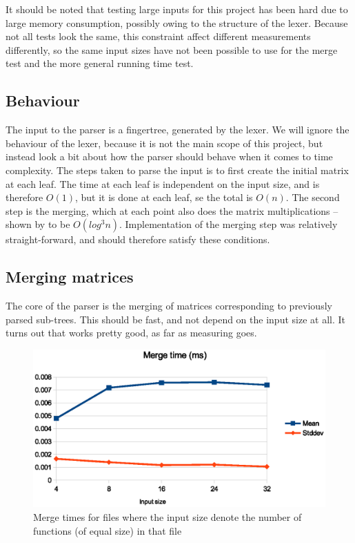 \documentclass[a4paper,12pt,twosided]{report}
\begin{document}
It should be noted that testing large inputs for this project has been hard due
to large memory consumption, possibly owing to the structure of the lexer.
Because not all tests look the same, this constraint affect different
measurements differently, so the same input sizes have not been possible to use
for the merge test and the more general running time test.

\subsection{Behaviour}
The input to the parser is a fingertree, generated by the lexer. We will ignore
the behaviour of the lexer, because it is not the main scope of this project, but
instead look a bit about how the parser should behave when it comes to time
complexity. The steps taken to parse the input is to first create the initial
matrix at each leaf. The time at each leaf is independent on the input size, and
is therefore $O(1)$, but it is done at each leaf, se the total is $O(n)$. The
second step is the merging, which at each point also does the matrix
multiplications -- shown by \citeauthor{parparsepaper} to be $O(log^3 n)$.
Implementation of the merging step was relatively straight-forward, and should
therefore satisfy these conditions. 

\subsection{Merging matrices}
The core of the parser is the merging of matrices corresponding to previously
parsed sub-trees. This should be fast, and not depend on the input size at all.
It turns out that works pretty good, as far as measuring goes.

\begin{figure}
\includegraphics[width=\textwidth]{criterion-merge.eps}
\caption{\label{critmerge}Merge times for files where the input size denote the
number of functions (of equal size) in that file}
\end{figure}
\end{document}
